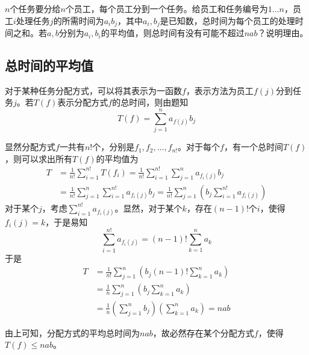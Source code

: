 

$n$个任务要分给$n$个员工，每个员工分到一个任务。给员工和任务编号为$1 \dots n$，员工$i$处理任务$j$的所需时间为$a_ib_j$，其中$a_i, b_j$是已知数，总时间为每个员工的处理时间之和。若$a, b$分别为$a_i, b_i$的平均值，则总时间有没有可能不超过$nab$？说明理由。


\subsection{总时间的平均值}

对于某种任务分配方式，可以将其表示为一函数$f$，表示方法为员工$f(j)$分到任务$j$。若$T(f)$表示分配方式$f$的总时间，则由题知
\[ T(f) = \sum_{j = 1}^n a_{f(j)}b_j \]

显然分配方式$f$一共有$n!$个，分别是$f_1, f_2, \dots, f_{n!}$。对于每个$f$，有一个总时间$T(f)$，则可以求出所有$T(f)$的平均值为
\begin{align*}
  T &= \frac1{n!}\sum_{i = 1}^{n!} T(f_i) = \frac1{n!}\sum_{i = 1}^{n!} \sum_{j = 1}^n a_{f_i(j)}b_j \\
  &= \frac1{n!}\sum_{j = 1}^n \sum_{i = 1}^{n!} a_{f_i(j)}b_j = \frac1{n!}\sum_{j = 1}^n \left(b_j \sum_{i = 1}^{n!} a_{f_i(j)}\right)
\end{align*}
对于某个$j$，考虑$\sum_{i = 1}^{n!} a_{f_i(j)}$。显然，对于某个$k$，存在$(n - 1)!$个$i$，使得$f_i(j) = k$，于是易知
\[ \sum_{i = 1}^{n!} a_{f_i(j)} = (n - 1)! \sum_{k = 1}^n a_k \]
于是
\begin{align*}
  T &= \frac1{n!}\sum_{j = 1}^n \left(b_j(n - 1)! \sum_{k = 1}^n a_k\right) \\
  &= \frac1n\sum_{j = 1}^n \left(b_j \sum_{k = 1}^n a_k\right) \\
  &= \frac1n\left(\sum_{j = 1}^n b_j\right)\left(\sum_{k = 1}^n a_k\right) = nab
\end{align*}

由上可知，分配方式的平均总时间为$nab$，故必然存在某个分配方式$f$，使得$T(f) \le nab$。
